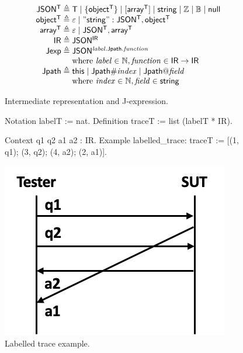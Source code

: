 \begin{figure}
\[\begin{array}{r@{\;}l}
\mathsf{JSON^T}\triangleq&\mathsf T\mid\{\mathsf{object^T}\}\mid[\mathsf{array^T}]\mid\mathsf{string}\mid\Int\mid\Bool\mid\mathsf{null}\\
\mathsf{object^T}\triangleq&\nil\mid\mathsf{"string": JSON^T,object^T}\\
\mathsf{array^T}\triangleq&\nil\mid\mathsf{JSON^T,array^T}\\
\mathsf{IR}\triangleq&\mathsf{JSON^{IR}}\\
\mathsf{Jexp}\triangleq&\mathsf{JSON^{\Jref{\mathit{label}}{\Jpath}{\mathit{function}}}}\\
&\text{where }\mathit{label}\in\Nat,\mathit{function}\in\mathsf{IR}\to\mathsf{IR}\\
\Jpath\triangleq&\This\mid\Jpath\Number\mathit{index}\mid\Jpath\At\mathit{field}\\
&\text{where }\mathit{index}\in\Nat,\mathit{field}\in\mathsf{string}
\end{array}\]
\caption{Intermediate representation and J-expression.}
\label{fig:ir-jexp}
\end{figure}

\begin{figure}
\begin{minipage}{.6\textwidth}
\begin{coq}
Notation   labelT := nat.
Definition traceT := list (labelT * IR).

Context q1 q2 a1 a2 : IR.
Example labelled_trace: traceT :=
  [(1, q1); (3, q2); (4, a2); (2, a1)].
\end{coq}
\end{minipage}\begin{minipage}{.3\textwidth}
  \includegraphics[width=\linewidth]{figures/ir-trace}
\end{minipage}
\caption{Labelled trace example.}
\label{fig:ir-trace}
\end{figure}

